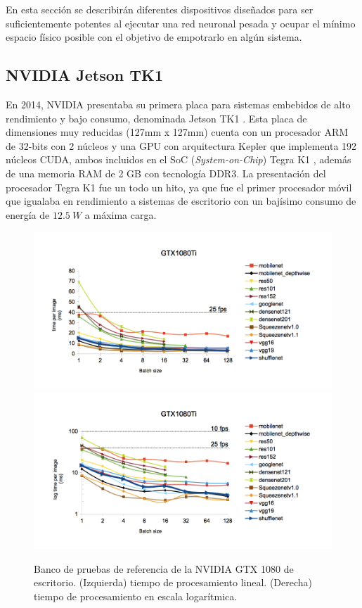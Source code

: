 En esta sección se describirán diferentes dispositivos diseñados para ser suficientemente potentes al ejecutar una red neuronal pesada y ocupar el mínimo espacio físico posible con el objetivo de empotrarlo en algún sistema.

\subsection{NVIDIA Jetson TK1}

En 2014, NVIDIA presentaba su primera placa para sistemas embebidos de alto rendimiento y bajo consumo, denominada Jetson TK1 \cite{jetsontk1}. Esta placa de dimensiones muy reducidas (127mm x 127mm) cuenta con un procesador ARM de 32-bits con 2 núcleos y una GPU con arquitectura Kepler que implementa 192 núcleos CUDA, ambos incluidos en el SoC (\textit{System-on-Chip}) Tegra K1 \cite{tegrak1}, además de una memoria RAM de 2 GB con tecnología DDR3. La presentación del procesador Tegra K1 fue un todo un hito, ya que fue el primer procesador móvil que igualaba en rendimiento a sistemas de escritorio con un bajísimo consumo de energía de $12.5\ W$ a máxima carga. 

\begin{figure}[htp]
    \centering
    \captionsetup{justification=centering}
    \includegraphics[width=.5\textwidth]{img/gtx1080_linear.png}\hfill
    \includegraphics[width=.5\textwidth]{img/gtx1080_log.png}
    \caption{Banco de pruebas de referencia de la NVIDIA GTX 1080 de escritorio. (Izquierda) tiempo de procesamiento lineal. (Derecha) tiempo de procesamiento en escala logarítmica.}
    \label{fig:ben_gtx}
\end{figure}

